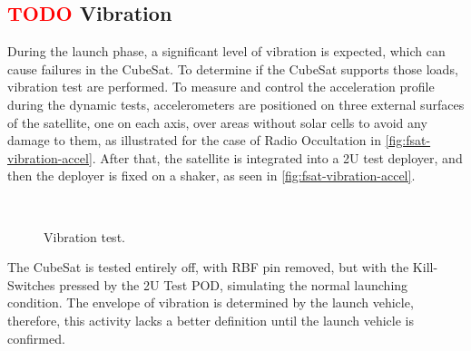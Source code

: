 \subsection{ \textcolor{red}{TODO} Vibration}

During the launch phase, a significant level of vibration is expected, which can cause failures in the CubeSat. To determine if the CubeSat supports those loads, vibration test are performed. To measure and control the acceleration profile during the dynamic tests, accelerometers are positioned on three external surfaces of the satellite, one on each axis, over areas without solar cells to avoid any damage to them, as illustrated for the case of Radio Occultation in \autoref{fig:fsat-vibration-accel}. After that, the satellite is integrated into a 2U test deployer, and then the deployer is fixed on a shaker, as seen in \autoref{fig:fsat-vibration-accel}.

\begin{figure}[!htb]
    \begin{center}
        ~
        \caption{Vibration test.}
        \label{fig:vibration-test}
    \end{center}
\end{figure}

The CubeSat is tested entirely off, with RBF pin removed, but with the Kill-Switches pressed by the 2U Test POD, simulating the normal launching condition. The envelope of vibration is determined by the launch vehicle, therefore, this activity lacks a better definition until the launch vehicle is confirmed.

